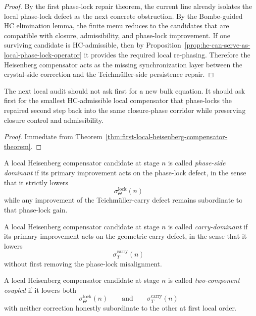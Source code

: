 \begin{proof}
By the first phase-lock repair theorem, the current line already isolates the local phase-lock defect as the next concrete obstruction. By the Bombe-guided HC elimination lemma, the finite menu reduces to the candidates that are compatible with closure, admissibility, and phase-lock improvement. If one surviving candidate is HC-admissible, then by Proposition~\ref{prop:hc-can-serve-as-local-phase-lock-operator} it provides the required local re-phasing. Therefore the Heisenberg compensator acts as the missing synchronization layer between the crystal-side correction and the Teichm\"uller-side persistence repair.
\end{proof}

\begin{corollary}
\label{cor:current-hc-working-rule}
The next local audit should not ask first for a new bulk equation. It should ask first for the smallest HC-admissible local compensator that phase-locks the repaired second step back into the same closure-phase corridor while preserving closure control and admissibility.
\end{corollary}

\begin{proof}
Immediate from Theorem~\ref{thm:first-local-heisenberg-compensator-theorem}.
\end{proof}



\begin{definition}
\label{def:phase-side-dominant-hc-candidate}
A local Heisenberg compensator candidate at stage $n$ is called \emph{phase-side dominant} if its primary improvement acts on the phase-lock defect, in the sense that it strictly lowers
\[
  \sigma_{\Theta}^{\mathrm{lock}}(n)
\]
while any improvement of the Teichm\"uller-carry defect remains subordinate to that phase-lock gain.
\end{definition}

\begin{definition}
\label{def:carry-dominant-hc-candidate}
A local Heisenberg compensator candidate at stage $n$ is called \emph{carry-dominant} if its primary improvement acts on the geometric carry defect, in the sense that it lowers
\[
  \sigma_T^{\mathrm{carry}}(n)
\]
without first removing the phase-lock misalignment.
\end{definition}

\begin{definition}
\label{def:two-component-hc-candidate}
A local Heisenberg compensator candidate at stage $n$ is called \emph{two-component coupled} if it lowers both
\[
  \sigma_{\Theta}^{\mathrm{lock}}(n)
  \qquad\text{and}\qquad
  \sigma_T^{\mathrm{carry}}(n)
\]
with neither correction honestly subordinate to the other at first local order.
\end{definition}

